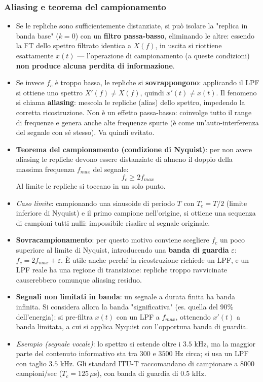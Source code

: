 \documentclass[12pt, a4paper]{article}
\begin{document}
\subsubsection{Aliasing e teorema del campionamento}
\begin{itemize}
    \item Se le repliche sono sufficientemente distanziate, si può isolare la "replica in banda base" ($k=0$) con un \textbf{filtro passa-basso}, eliminando le altre: essendo la FT dello spettro filtrato identica a $X(f)$, in uscita si riottiene esattamente $x(t)$ — l'operazione di campionamento (a queste condizioni) \textbf{non produce alcuna perdita di informazione}.
    \item Se invece $f_c$ è troppo bassa, le repliche si \textbf{sovrappongono}: applicando il LPF si ottiene uno spettro $X'(f)\ne X(f)$, quindi $x'(t)\ne x(t)$. Il fenomeno si chiama \textbf{aliasing}: mescola le repliche (alias) dello spettro, impedendo la corretta ricostruzione. Non è un effetto passa-basso: coinvolge tutto il range di frequenze e genera anche alte frequenze spurie (è come un'auto-interferenza del segnale con sé stesso). Va quindi evitato.
    \item \textbf{Teorema del campionamento (condizione di Nyquist)}: per non avere aliasing le repliche devono essere distanziate di almeno il doppio della massima frequenza $f_{max}$ del segnale:
    $$f_c \ge 2f_{max}$$
    Al limite le repliche si toccano in un solo punto.
    \item \textit{Caso limite}: campionando una sinusoide di periodo $T$ con $T_c=T/2$ (limite inferiore di Nyquist) e il primo campione nell'origine, si ottiene una sequenza di campioni tutti nulli: impossibile risalire al segnale originale.
    \item \textbf{Sovracampionamento}: per questo motivo conviene scegliere $f_c$ un poco superiore al limite di Nyquist, introducendo una \textbf{banda di guardia} $\varepsilon$: $f_c=2f_{max}+\varepsilon$. È utile anche perché la ricostruzione richiede un LPF, e un LPF reale ha una regione di transizione: repliche troppo ravvicinate causerebbero comunque aliasing residuo.
    \item \textbf{Segnali non limitati in banda}: un segnale a durata finita ha banda infinita. Si considera allora la banda "significativa" (es. quella del 90\% dell'energia): si pre-filtra $x(t)$ con un LPF a $f_{max}$, ottenendo $x'(t)$ a banda limitata, a cui si applica Nyquist con l'opportuna banda di guardia.
    \item \textit{Esempio (segnale vocale)}: lo spettro si estende oltre i $3.5$ kHz, ma la maggior parte del contenuto informativo sta tra $300$ e $3500$ Hz circa; si usa un LPF con taglio $3.5$ kHz. Gli standard ITU-T raccomandano di campionare a $8000$ campioni/sec ($T_c=125\,\mu$s), con banda di guardia di $0.5$ kHz.
\end{itemize}
\end{document}
